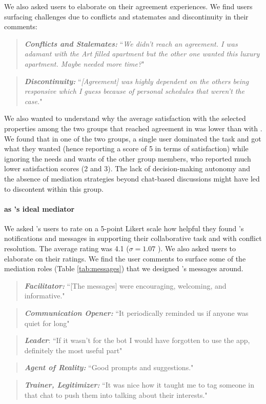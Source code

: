 We also asked \baseline users to elaborate on their agreement experiences. We find users surfacing challenges due to conflicts and statemates and discontinuity in their comments:
\begin{quote}
\textbf{\textit{Conflicts and Stalemates:}} ``\textit{We didn’t reach an agreement. I was adamant with the Art filled apartment but the other one wanted
this luxury apartment. Maybe needed more time?}" 
\end{quote}
\begin{quote}
\textbf{\textit{Discontinuity:}} ``\textit{[Agreement] was highly dependent on the others being responsive which I
guess because of personal schedules that weren’t the case.}"
\end{quote}

We also wanted to understand why the average satisfaction with the selected properties among the two groups that reached agreement in \baseline was lower than with \tool. We found that in one of the two groups, a single user dominated the task and got what they wanted (hence reporting a score of 5 in terms of satisfaction) while ignoring the needs and wants of the other group members, who reported much lower satisfaction scores (2 and 3). The lack of decision-making autonomy and the absence of mediation strategies beyond chat-based discussions might have led to discontent within this \baseline group.

\paragraph{\cbot as \citeauthor{themediationprocess}'s ideal mediator}
We asked \tool's users to rate on a 5-point Likert scale how helpful they found \cbot's notifications and messages in supporting their collaborative task and with conflict resolution. The average rating was 4.1 ($\sigma = 1.07$ 
).%
We also asked users to elaborate on their ratings. We find the user comments to surface some of the mediation roles (Table \ref{tab:messages}) that we designed \cbot's messages around. 
\begin{quote}
\textbf{\textit{Facilitator:}} ``[The messages] were encouraging, welcoming, and informative."  
\end{quote}
\begin{quote}
\textbf{\textit{Communication Opener:}} ``It periodically reminded us if anyone was quiet for long"  
\end{quote}
\begin{quote}
    \textbf{\textit{Leader}}: ``If it wasn't for the bot I would have forgotten to use the app, definitely the most useful part"
\end{quote}
\begin{quote}
  \textbf{\textit{Agent of Reality: }} ``Good prompts and suggestions."
\end{quote}
\begin{quote}
\textbf{\textit{Trainer, Legitimizer: }} ``It was nice how it taught me to tag someone in that chat to push them into talking about their interests."
\end{quote}

